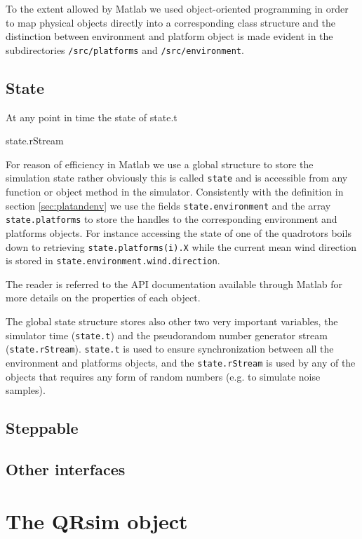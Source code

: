 \documentclass[a4paper,10pt]{report}
\newcommand{\sname}{QRsim\xspace}
\begin{document}
To the extent allowed by Matlab we used object-oriented programming in order to map physical objects directly into a corresponding class structure and the distinction between environment and platform object is made evident in the subdirectories \texttt{/src/platforms} and \texttt{/src/environment}.

\subsection{State}

At any point in time the state of 
state.t

state.rStream




For reason of efficiency in Matlab we use a global structure to store the simulation state rather obviously this is called \texttt{state} and is accessible from any function or object method in the simulator.
Consistently with the definition in section \ref{sec:platandenv} we use the fields \texttt{state.environment} and the array \texttt{state.platforms} to store the handles to the corresponding environment and platforms objects. For instance accessing the state of one of the quadrotors boils down to retrieving \texttt{state.platforms(i).X} while the current mean wind direction is stored in \texttt{state.environment.wind.direction}.
  
The reader is referred to the API documentation available through Matlab for more details on the properties of each object.

The global state structure stores also other two very important variables, the simulator time (\texttt{state.t}) and the pseudorandom number generator stream (\texttt{state.rStream}). \texttt{state.t} is used to ensure synchronization between all the environment and platforms objects, and the \texttt{state.rStream} is used by any of the objects that requires any form of random numbers (e.g. to simulate noise samples). 

\subsection{Steppable}



\subsection{Other interfaces}


\section{The \sname object}
\end{document}
